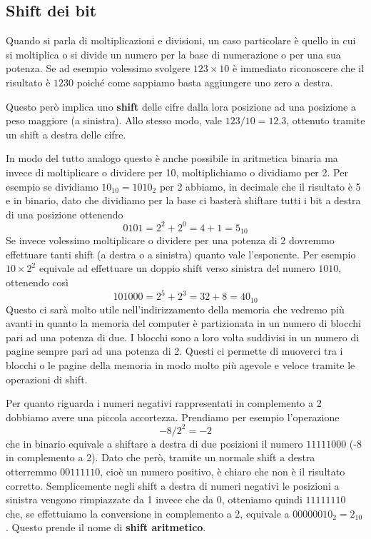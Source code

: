 \subsection{Shift dei bit}
Quando si parla di moltiplicazioni e divisioni, un caso particolare è quello in cui si moltiplica
o si divide un numero per la base di numerazione o per una sua potenza. Se ad esempio volessimo
svolgere $123 \times 10$ è immediato riconoscere che il risultato è $1230$ poiché come sappiamo
basta aggiungere uno zero a destra.

Questo però implica uno \textbf{shift} delle cifre dalla lora posizione ad una posizione a peso
maggiore (a sinistra). Allo stesso modo, vale $123 / 10 = 12.3$, ottenuto tramite un shift a destra
delle cifre.

In modo del tutto analogo questo è anche possibile in aritmetica binaria ma invece di moltiplicare
o dividere per 10, moltiplichiamo o dividiamo per 2. Per esempio se dividiamo $10_{10} = 1010_2$
per 2 abbiamo, in decimale che il risultato è 5 e in binario, dato che dividiamo per la base ci
basterà shiftare tutti i bit a destra di una posizione ottenendo
\[ 0101 = 2^2 + 2^0 = 4 + 1 = 5_{10} \]
Se invece volessimo moltiplicare o dividere per una potenza di 2 dovremmo effettuare tanti shift
(a destra o a sinistra) quanto vale l'esponente. Per esempio $10 \times 2^2$ equivale ad effettuare
un doppio shift verso sinistra del numero $1010$, ottenendo così
\[ 101000 = 2^5 + 2^3 = 32 + 8 = 40_{10} \]
Questo ci sarà molto utile nell'indirizzamento della memoria che vedremo più avanti in quanto la
memoria del computer è partizionata in un numero di blocchi pari ad una potenza di due. I blocchi
sono a loro volta suddivisi in un numero di pagine sempre pari ad una potenza di 2. Questi ci
permette di muoverci tra i blocchi o le pagine della memoria in modo molto più agevole e veloce
tramite le operazioni di shift.

Per quanto riguarda i numeri negativi rappresentati in complemento a 2 dobbiamo avere una piccola
accortezza. Prendiamo per esempio l'operazione
\[ -8 / 2^2 = -2 \]
che in binario equivale a shiftare a destra di due posizioni il numero $11111000$ (-8 in
complemento a 2). Dato che però, tramite un normale shift a destra otterremmo $00111110$, cioè un
numero positivo, è chiaro che non è il risultato corretto. Semplicemente negli shift a destra di
numeri negativi le posizioni a sinistra vengono rimpiazzate da 1 invece che da 0, otteniamo quindi
$11111110$ che, se effettuiamo la conversione in complemento a 2, equivale a $00000010_2 = 2_{10}$.
Questo prende il nome di \textbf{shift aritmetico}.

